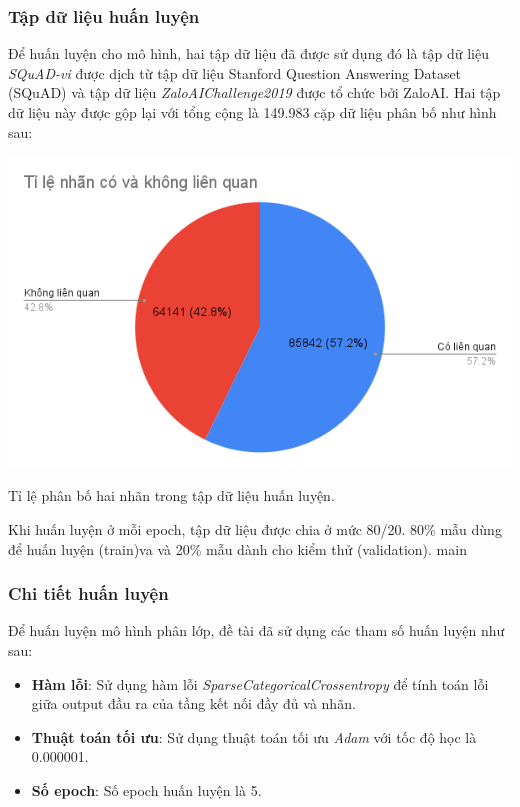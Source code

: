 \documentclass[a4paper, 12pt, openany]{book}
\begin{document}
\subsubsection{Tập dữ liệu huấn luyện}

Để huấn luyện cho mô hình, hai tập dữ liệu đã được sử dụng đó là tập dữ liệu \textit{SQuAD-vi} được dịch từ tập dữ liệu Stanford Question Answering Dataset (SQuAD) \cite{rajpurkar-etal-2016-squad} và tập dữ liệu
\textit{ZaloAIChallenge2019} được tổ chức bởi ZaloAI. Hai tập dữ liệu này được gộp lại với tổng cộng là 149.983 cặp dữ liệu phân bố như hình sau:

\begin{minipage}{\linewidth}
    \centering
    \includegraphics[width=.8\linewidth]{./assets/images/data-ratio.png}
    \captionsetup{type=figure}
    \caption{Tỉ lệ phân bố hai nhãn trong tập dữ liệu huấn luyện.}
\end{minipage}
\vspace{0.5cm}

Khi huấn luyện ở mỗi epoch, tập dữ liệu được chia ở mức 80/20. 80\% mẫu dùng để huấn luyện (train)va
và 20\% mẫu dành cho kiểm thử (validation).
main
\subsubsection{Chi tiết huấn luyện}

Để huấn luyện mô hình phân lớp, đề tài đã sử dụng các tham số huấn luyện như sau:

\begin{itemize}
    \item \textbf{Hàm lỗi}: Sử dụng hàm lỗi \textit{SparseCategoricalCrossentropy} để tính toán lỗi giữa output đầu ra của tầng kết nối đầy đủ và nhãn.
    \item \textbf{Thuật toán tối ưu}: Sử dụng thuật toán tối ưu \textit{Adam} với tốc độ học là 0.000001.
    \item \textbf{Số epoch}: Số epoch huấn luyện là 5.
\end{itemize}
\end{document}
